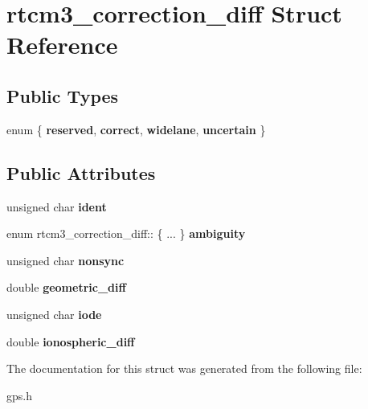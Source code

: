 \hypertarget{structrtcm3__correction__diff}{\section{rtcm3\-\_\-correction\-\_\-diff \-Struct \-Reference}
\label{structrtcm3__correction__diff}
}
\subsection*{\-Public \-Types}
\begin{DoxyCompactItemize}
\item 
enum \{ {\bfseries reserved}, 
{\bfseries correct}, 
{\bfseries widelane}, 
{\bfseries uncertain}
 \}
\end{DoxyCompactItemize}
\subsection*{\-Public \-Attributes}
\begin{DoxyCompactItemize}
\item 
\hypertarget{structrtcm3__correction__diff_a5631e458acc459c9b4a3ba7a1fea8afc}{unsigned char {\bfseries ident}}\label{structrtcm3__correction__diff_a5631e458acc459c9b4a3ba7a1fea8afc}

\item 
\hypertarget{structrtcm3__correction__diff_a2ac085ab2778dd3359a24bbf0a43c393}{enum rtcm3\-\_\-correction\-\_\-diff\-:: \{ ... \}  {\bfseries ambiguity}}\label{structrtcm3__correction__diff_a2ac085ab2778dd3359a24bbf0a43c393}

\item 
\hypertarget{structrtcm3__correction__diff_a84641ca18a6238993ed2f6991f974461}{unsigned char {\bfseries nonsync}}\label{structrtcm3__correction__diff_a84641ca18a6238993ed2f6991f974461}

\item 
\hypertarget{structrtcm3__correction__diff_a31a04458729adfda6696c7d61f144028}{double {\bfseries geometric\-\_\-diff}}\label{structrtcm3__correction__diff_a31a04458729adfda6696c7d61f144028}

\item 
\hypertarget{structrtcm3__correction__diff_ac053cc3e5c7e03c3896e38913446e04f}{unsigned char {\bfseries iode}}\label{structrtcm3__correction__diff_ac053cc3e5c7e03c3896e38913446e04f}

\item 
\hypertarget{structrtcm3__correction__diff_a4d2fe30321ad1a0c4edec666c96143de}{double {\bfseries ionospheric\-\_\-diff}}\label{structrtcm3__correction__diff_a4d2fe30321ad1a0c4edec666c96143de}

\end{DoxyCompactItemize}


\-The documentation for this struct was generated from the following file\-:\begin{DoxyCompactItemize}
\item 
gps.\-h\end{DoxyCompactItemize}

